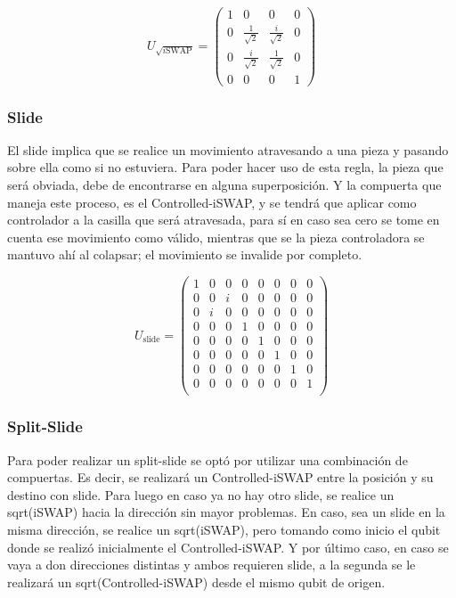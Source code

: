 \[
U_{\sqrt{i\text{SWAP}}} = \begin{pmatrix}
	1 & 0 & 0 & 0 \\
	0 & \frac{1}{\sqrt{2}} & \frac{i}{\sqrt{2}} & 0 \\
	0 & \frac{i}{\sqrt{2}} & \frac{1}{\sqrt{2}} & 0 \\
	0 & 0 & 0 & 1
\end{pmatrix}
\]

\subsubsection{Slide}

El slide implica que se realice un movimiento atravesando a una pieza y pasando sobre ella como si no estuviera. Para poder hacer uso de esta regla, la pieza que será obviada, debe de encontrarse en alguna superposición. Y la compuerta que maneja este proceso, es el Controlled-iSWAP, y se tendrá que aplicar como controlador a la casilla que será atravesada, para sí en caso sea cero se tome en cuenta ese movimiento como válido, mientras que se la pieza controladora se mantuvo ahí al colapsar; el movimiento se invalide por completo.

\[
U_{\text{slide}} = \begin{pmatrix}
	1 & 0 & 0 & 0 & 0 & 0 & 0 & 0 \\
	0 & 0 & i & 0 & 0 & 0 & 0 & 0 \\
	0 & i & 0 & 0 & 0 & 0 & 0 & 0 \\
	0 & 0 & 0 & 1 & 0 & 0 & 0 & 0 \\
	0 & 0 & 0 & 0 & 1 & 0 & 0 & 0 \\
	0 & 0 & 0 & 0 & 0 & 1 & 0 & 0 \\
	0 & 0 & 0 & 0 & 0 & 0 & 1 & 0 \\
	0 & 0 & 0 & 0 & 0 & 0 & 0 & 1 \\
\end{pmatrix}
\]

\subsubsection{Split-Slide}

Para poder realizar un split-slide se optó por utilizar una combinación de compuertas. Es decir, se realizará un Controlled-iSWAP entre la posición y su destino con slide. Para luego en caso ya no hay otro slide, se realice un sqrt(iSWAP) hacia la dirección sin mayor problemas. En caso, sea un slide en la misma dirección, se realice un sqrt(iSWAP), pero tomando como inicio el qubit donde se realizó inicialmente el Controlled-iSWAP. Y por último caso, en caso se vaya a don direcciones distintas y ambos requieren slide, a la segunda se le realizará un sqrt(Controlled-iSWAP) desde el mismo qubit de origen.

